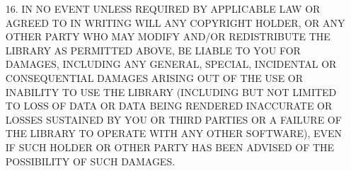 \begin{multicols}{3}
\begin{itemize}
\item[16.] IN NO EVENT UNLESS REQUIRED BY APPLICABLE LAW OR AGREED TO
  IN WRITING WILL ANY COPYRIGHT HOLDER, OR ANY OTHER PARTY WHO MAY
  MODIFY AND/OR REDISTRIBUTE THE LIBRARY AS PERMITTED ABOVE, BE LIABLE
  TO YOU FOR DAMAGES, INCLUDING ANY GENERAL, SPECIAL, INCIDENTAL OR
  CONSEQUENTIAL DAMAGES ARISING OUT OF THE USE OR INABILITY TO USE THE
  LIBRARY (INCLUDING BUT NOT LIMITED TO LOSS OF DATA OR DATA BEING
  RENDERED INACCURATE OR LOSSES SUSTAINED BY YOU OR THIRD PARTIES OR A
  FAILURE OF THE LIBRARY TO OPERATE WITH ANY OTHER SOFTWARE), EVEN IF
  SUCH HOLDER OR OTHER PARTY HAS BEEN ADVISED OF THE POSSIBILITY OF
  SUCH DAMAGES.
\end{itemize}
\end{multicols}
%
%
%
